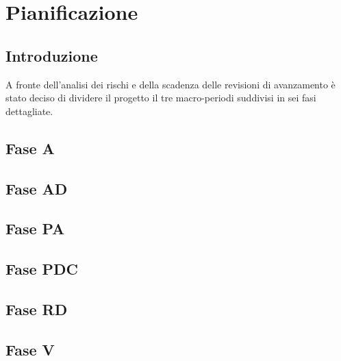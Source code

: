 \section{Pianificazione} 
	\subsection{Introduzione}
	A fronte dell'analisi dei rischi e della scadenza delle revisioni di avanzamento è stato deciso di dividere il progetto il tre macro-periodi suddivisi in sei fasi dettagliate.
	\subsection{Fase A}
	\subsection{Fase AD}
	\subsection{Fase PA}
	\subsection{Fase PDC}
	\subsection{Fase RD}
	\subsection{Fase V}
	
